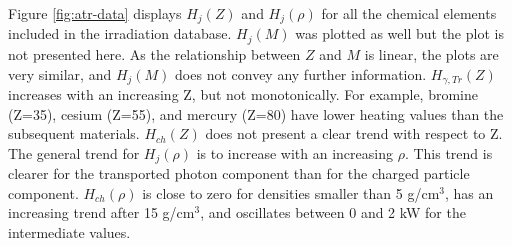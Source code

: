 
Figure \ref{fig:atr-data} displays $H_j(Z)$ and $H_j(\rho)$ for all the chemical elements included in the irradiation database.
$H_j(M)$ was plotted as well but the plot is not presented here.
As the relationship between $Z$ and $M$ is linear, the plots are very similar, and $H_j(M)$ does not convey any further information.
$H_{\gamma, Tr}(Z)$ increases with an increasing Z, but not monotonically.
For example, bromine (Z=35), cesium (Z=55), and mercury (Z=80) have lower heating values than the subsequent materials.
$H_{ch}(Z)$ does not present a clear trend with respect to Z.
The general trend for $H_j(\rho)$ is to increase with an increasing $\rho$.
This trend is clearer for the transported photon component than for the charged particle component.
$H_{ch}(\rho)$ is close to zero for densities smaller than 5 g/cm$^3$, has an increasing trend after 15 g/cm$^3$, and oscillates between 0 and 2 kW for the intermediate values.

